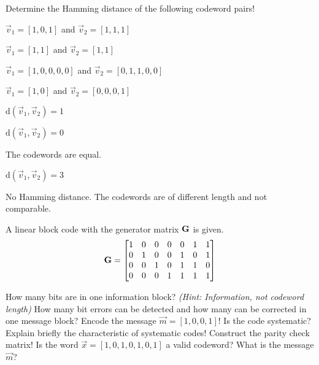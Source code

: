 \begin{question}[subtitle={Hamming Distance}]
	Determine the Hamming distance of the following codeword pairs!
	
	\begin{tasks}
		\task
		$\vec{v}_1 = \left[1, 0, 1\right]$ and $\vec{v}_2 = \left[1, 1, 1\right]$
		
		\task
		$\vec{v}_1 = \left[1, 1\right]$ and $\vec{v}_2 = \left[1, 1\right]$
		
		\task
		$\vec{v}_1 = \left[1, 0, 0, 0, 0\right]$ and $\vec{v}_2 = \left[0, 1, 1, 0, 0\right]$
		
		\task
		$\vec{v}_1 = \left[1, 0\right]$ and $\vec{v}_2 = \left[0, 0, 0, 1\right]$
	\end{tasks}
\end{question}

\begin{solution}
	\begin{tasks}
		\task
		$\mathrm{d}\left(\vec{v}_1, \vec{v}_2\right) = 1$
		
		\task
		$\mathrm{d}\left(\vec{v}_1, \vec{v}_2\right) = 0$
		
		The codewords are equal.
		
		\task
		$\mathrm{d}\left(\vec{v}_1, \vec{v}_2\right) = 3$
		
		\task
		No Hamming distance. The codewords are of different length and not comparable.
	\end{tasks}
\end{solution}

\begin{question}[subtitle={Channel Coding}]
	A linear block code with the generator matrix $\bm{\mathrm{G}}$ is given.
	\begin{equation*}
		\bm{\mathrm{G}} = \left[\begin{matrix}
			1 & 0 & 0 & 0 & 0 & 1 & 1 \\
			0 & 1 & 0 & 0 & 1 & 0 & 1 \\
			0 & 0 & 1 & 0 & 1 & 1 & 0 \\
			0 & 0 & 0 & 1 & 1 & 1 & 1
		\end{matrix}\right]
	\end{equation*}
	
	\begin{tasks}
		\task
		How many bits are in one information block? \textit{(Hint: Information, not codeword length)}
		\task
		How many bit errors can be detected and how many can be corrected in one message block?
		\task
		Encode the message $\vec{m} = \left[1, 0, 0, 1\right]$!
		\task
		Is the code systematic? Explain briefly the characteristic of systematic codes!
		\task
		Construct the parity check matrix!
		\task
		Is the word $\vec{x} = \left[1, 0, 1, 0, 1, 0, 1\right]$ a valid codeword? What is the message $\vec{m}$?
	\end{tasks}
\end{question}

